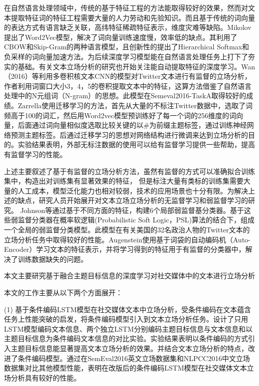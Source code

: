 在自然语言处理领域中，传统的基于特征工程的方法能取得较好的效果，然而对文本提取特征词的特征工程需要大量的人力劳动和先验知识。而且基于传统的词向量的表达方式有语言缺乏关联，高纬特征稀疏特征表示，维度灾难等缺陷。Mikolov\cite{mikolov2013efficient}提出了Word2Vec模型，解决了词向量训练速度慢，效率低的缺点。其利用了CBOW和Skip-Gram的两种语言模型，且创新性的提出了Hierarchical Softmax和负采样的词向量加速方法。为后续深度学习模型能在自然语言处理任务上打下了夯实的基础。有关文本立场分析的研究也开始关注能自动提取特征的深度学习。Wan（2016）等利用多卷积核文本CNN的模型对Twitter文本进行有监督的立场分析，作者利用词窗口大小3，4，5的卷积提取文本中的特征，这算方法借鉴了自然语言处理中的N元组词（N-gram）的思想。此模型在Semeval2016-TaskA取得较好的成绩。Zarrella\cite{zarrella2016mitre}使用迁移学习的方法，首先从大量的不标注Twitter数据中，选取了词频高于100的词汇，然后用Word2vec模型预训练好了每一个词的256维度的词向量，后面通过词向量相似度选取比较关键的以\#为前缀主题标签，通过训练神经网络预测主题标签。后通过迁移学习的思想对网络结构进行微调来达到立场分析的目的。实验结果表明，外部无标注数据的使用可以给有监督学习提供一些帮助，提高有监督学习的性能。

上述主要叙述了基于有监督的立场分析方法，虽然有监督的方式可以准确拟合训练集中，构造出对训练集有显著效果的特征， 但是标注大量有类标的训练集需要大量的人工成本，模型泛化能力也相对较弱，技术的应用场景也十分有限。为解决上述的缺点，研究人员开始展开对文本立场立场分析的无监督学习和弱监督学习的研究。 Johnson\cite{johnson2016all}等通过基于不同方面的特征，构建6个局部弱监督基分类器。基于这些弱监督分类器在概率软逻辑(Probabilistic Soft Logic，PSL)算法的结合下，组成一个全局的弱监督分类模型。此模型在有关美国的32名政治人物的Twitter文本的立场分析任务中取得较好的性能。Augenstein\cite{augenstein2016usfd}使用基于词袋的自动编码机（Auto-Encoder）学习文本的特征表示，并将学习得到的特征用于有监督的分类器中，解决了训练数据缺失的问题。




本文主要研究基于融合主题目标信息的深度学习对社交媒体中的文本进行立场分析

本文的工作主要从以下两个方面展开：

(1) 基于条件编码LSTM模型在社交媒体文本中立场分析，受条件编码在文本蕴含任务上性能突破的启发，将条件编码模型引入到文本立场分析任务。设计了只用LSTM模型编码文本信息、两个独立LSTM分别编码主题目标信息与文本信息和以主题目标信息为条件编码文本信息的对比实验。实验结果表明以条件编码的方式引入主题目标信息能显著提高文本立场分析的效果。并结合文本立场分析的特点，改进了条件编码模型。通过在SemEval2016英文立场数据集和NLPCC2016中文立场数据集对比其他模型性能，表明在改版后的条件编码LSTM模型在社交媒体文本立场分析具有较好的性能。

